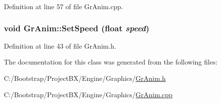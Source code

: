 Definition at line 57 of file GrAnim.cpp.\hypertarget{class_gr_anim_c027292f0a1cc72c12f616a5e328ea50}{
\subsubsection[{SetSpeed}]{\setlength{\rightskip}{0pt plus 5cm}void GrAnim::SetSpeed (float {\em speed})}}
\label{class_gr_anim_c027292f0a1cc72c12f616a5e328ea50}




Definition at line 43 of file GrAnim.h.

The documentation for this class was generated from the following files:\begin{CompactItemize}
\item 
C:/Bootstrap/ProjectBX/Engine/Graphics/\hyperlink{_gr_anim_8h}{GrAnim.h}\item 
C:/Bootstrap/ProjectBX/Engine/Graphics/\hyperlink{_gr_anim_8cpp}{GrAnim.cpp}\end{CompactItemize}
